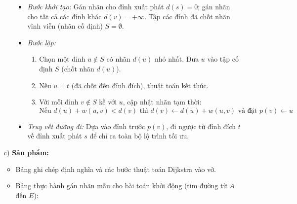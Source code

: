 \documentclass[12pt, a4paper]{article}
\begin{document}
\begin{itemize}[leftmargin=1.2cm]
\begin{itemize}[leftmargin=0.6cm]
\begin{itemize}
            \item \textit{Bước khởi tạo:} Gán nhãn cho đỉnh xuất phát $d(s) = 0$; gán nhãn cho tất cả các đỉnh khác $d(v) = +\infty$. Tập các đỉnh đã chốt nhãn vĩnh viễn (nhãn cố định) $S = \emptyset$.
            \item \textit{Bước lặp:}
            \begin{enumerate}[leftmargin=0.6cm]
                \item Chọn một đỉnh $u \notin S$ có nhãn $d(u)$ nhỏ nhất. Đưa $u$ vào tập cố định $S$ (chốt nhãn $d(u)$).
                \item Nếu $u = t$ (đã chốt đến đỉnh đích), thuật toán kết thúc.
                \item Với mỗi đỉnh $v \notin S$ kề với $u$, cập nhật nhãn tạm thời:
                $$\text{Nếu } d(u) + w(u, v) < d(v) \text{ thì } d(v) \leftarrow d(u) + w(u, v) \text{ và đặt } p(v) \leftarrow u$$
            \end{enumerate}
            \item \textit{Truy vết đường đi:} Dựa vào đỉnh trước $p(v)$, đi ngược từ đỉnh đích $t$ về đỉnh xuất phát $s$ để chỉ ra toàn bộ lộ trình tối ưu.
        \end{itemize}
    \end{itemize}

    \item[c)] \textbf{Sản phẩm:}
    \begin{itemize}[leftmargin=0.6cm]
        \item Bảng ghi chép định nghĩa và các bước thuật toán Dijkstra vào vở.
        \item Bảng thực hành gán nhãn mẫu cho bài toán khởi động (tìm đường từ $A$ đến $E$):
    \end{itemize}


\end{itemize}
\end{document}
